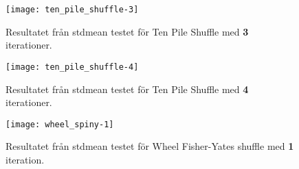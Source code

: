 \begin{figure}[H]
	\centering
	\texttt{[image: ten\_pile\_shuffle-3]} 
	\captionsetup{width=0.5\textwidth}
	\caption{Resultatet från \gls{stdmean} testet för Ten Pile
	Shuffle med \textbf{3} iterationer.}
	\label{fig:ten-3}
\end{figure}

\begin{figure}[H]
	\centering
	\texttt{[image: ten\_pile\_shuffle-4]} 
	\captionsetup{width=0.5\textwidth}
	\caption{Resultatet från \gls{stdmean} testet för Ten Pile
	Shuffle med \textbf{4} iterationer.}
	\label{fig:ten-4}
\end{figure}

\begin{figure}[H]
	\centering
	\texttt{[image: wheel\_spiny-1]} 
	\captionsetup{width=0.5\textwidth}
	\caption{Resultatet från \gls{stdmean} testet för Wheel Fisher-Yates shuffle med \textbf{1} iteration.}
	\label{fig:wheel-1}
\end{figure}
